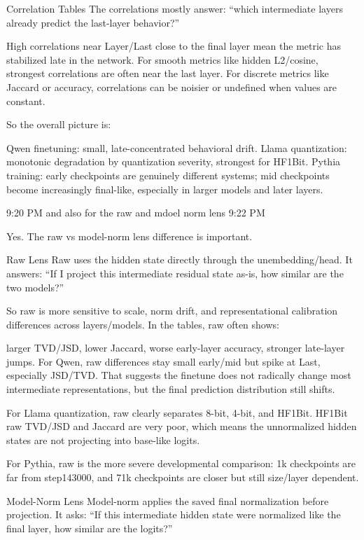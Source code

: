 Correlation Tables
The correlations mostly answer: “which intermediate layers already predict the last-layer behavior?”

High correlations near Layer/Last close to the final layer mean the metric has stabilized late in the network. For smooth metrics like hidden L2/cosine, strongest correlations are often near the last layer. For discrete metrics like Jaccard or accuracy, correlations can be noisier or undefined when values are constant.

So the overall picture is:

Qwen finetuning: small, late-concentrated behavioral drift.
Llama quantization: monotonic degradation by quantization severity, strongest for HF1Bit.
Pythia training: early checkpoints are genuinely different systems; mid checkpoints become increasingly final-like, especially in larger models and later layers.




9:20 PM
and also for the raw and mdoel norm lens
9:22 PM


Yes. The raw vs model-norm lens difference is important.

Raw Lens
Raw uses the hidden state directly through the unembedding/head. It answers: “If I project this intermediate residual state as-is, how similar are the two models?”

So raw is more sensitive to scale, norm drift, and representational calibration differences across layers/models. In the tables, raw often shows:

larger TVD/JSD,
lower Jaccard,
worse early-layer accuracy,
stronger late-layer jumps.
For Qwen, raw differences stay small early/mid but spike at Last, especially JSD/TVD. That suggests the finetune does not radically change most intermediate representations, but the final prediction distribution still shifts.

For Llama quantization, raw clearly separates 8-bit, 4-bit, and HF1Bit. HF1Bit raw TVD/JSD and Jaccard are very poor, which means the unnormalized hidden states are not projecting into base-like logits.

For Pythia, raw is the more severe developmental comparison: 1k checkpoints are far from step143000, and 71k checkpoints are closer but still size/layer dependent.

Model-Norm Lens
Model-norm applies the saved final normalization before projection. It asks: “If this intermediate hidden state were normalized like the final layer, how similar are the logits?”

